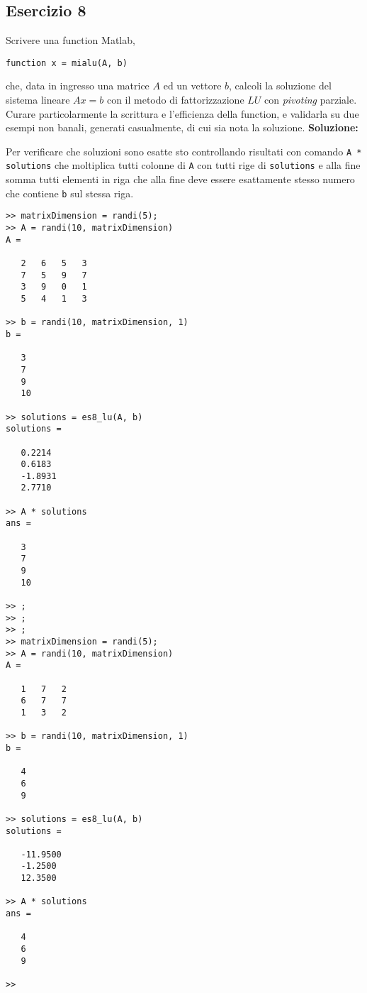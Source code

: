 \subsection{Esercizio 8}
Scrivere una function Matlab,
\begin{lstlisting}
function x = mialu(A, b)
\end{lstlisting}
che, data in ingresso una matrice $A$ ed un vettore $b$, calcoli la soluzione
del sistema lineare $Ax = b$ con il metodo di fattorizzazione $LU$ con \textit{pivoting} parziale.
Curare particolarmente la scrittura e l'efficienza della function,
e validarla su due esempi non banali, generati casualmente,
di cui sia nota la soluzione.
\newline \textbf{Soluzione:}


Per verificare che soluzioni sono esatte sto controllando risultati con comando \lstinline{A * solutions}
che moltiplica tutti colonne di \lstinline{A} con tutti rige di \lstinline{solutions} e alla fine somma tutti
elementi in riga che alla fine deve essere esattamente stesso numero
che contiene \lstinline{b} sul stessa riga.
\begin{lstlisting}
>> matrixDimension = randi(5);
>> A = randi(10, matrixDimension)
A =

   2   6   5   3
   7   5   9   7
   3   9   0   1
   5   4   1   3

>> b = randi(10, matrixDimension, 1)
b =

   3
   7
   9
   10

>> solutions = es8_lu(A, b)
solutions =

   0.2214
   0.6183
   -1.8931
   2.7710

>> A * solutions
ans =

   3
   7
   9
   10

>> ;
>> ;
>> ;
>> matrixDimension = randi(5);
>> A = randi(10, matrixDimension)
A =

   1   7   2
   6   7   7
   1   3   2

>> b = randi(10, matrixDimension, 1)
b =

   4
   6
   9

>> solutions = es8_lu(A, b)
solutions =

   -11.9500
   -1.2500
   12.3500

>> A * solutions
ans =

   4
   6
   9

>>
\end{lstlisting}
